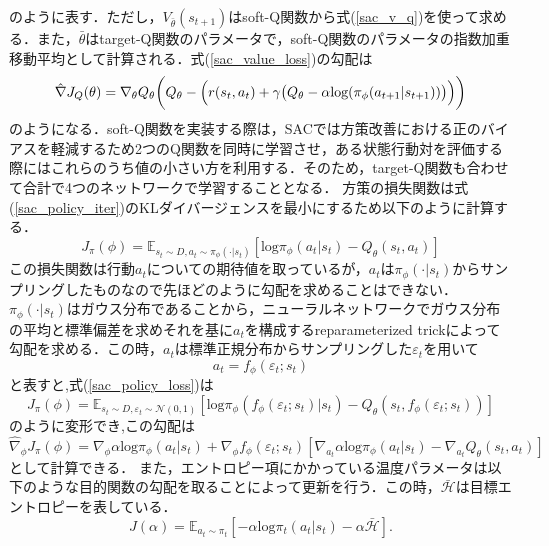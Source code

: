 \documentclass[dvipdfmx]{ampbt_nomag}
\begin{document}
のように表す．ただし，$V_{\bar{\theta}}(s_{t+1})$はsoft-Q関数から式(\ref{sac_v_q})を使って求める．また，$\bar{\theta}$はtarget-Q関数のパラメータで，soft-Q関数のパラメータの指数加重移動平均として計算される．式(\ref{sac_value_loss})の勾配は
\begin{eqnarray}
  \hat{\nabla}J_Q(\theta) = \nabla_\theta Q_\theta\biggl(Q_\theta - \Bigl(r(s_t,a_t) + \gamma \bigl(Q_\theta - \alpha \textrm{log}(\pi_{\phi}(a_{t+1}|s_{t+1}))\bigl)\Bigl)\biggl) 
\end{eqnarray}
のようになる．soft-Q関数を実装する際は，SACでは方策改善における正のバイアスを軽減するため2つのQ関数を同時に学習させ，ある状態行動対を評価する際にはこれらのうち値の小さい方を利用する\cite{DoubleQ}．そのため，target-Q関数も合わせて合計で4つのネットワークで学習することとなる．
方策の損失関数は式(\ref{sac_policy_iter})のKLダイバージェンスを最小にするため以下のように計算する．
\begin{equation} \label{sac_policy_loss}
  J_\pi(\phi) = \mathbb{E}_{s_t \sim D,a_t\sim\pi_\phi(\cdot|s_t)} \left[\textrm{log}\pi_\phi(a_t | s_t) - Q_\theta(s_t,a_t)\right]
\end{equation}
この損失関数は行動$a_t$についての期待値を取っているが，$a_t$は$\pi_\phi(\cdot|s_t)$からサンプリングしたものなので先ほどのように勾配を求めることはできない．$\pi_\phi(\cdot|s_t)$はガウス分布であることから，ニューラルネットワークでガウス分布の平均と標準偏差を求めそれを基に$a_t$を構成するreparameterized trickによって勾配を求める．この時，$a_t$は標準正規分布からサンプリングした$\varepsilon_t$を用いて
\begin{equation} \label{reparameterization}
  a_t = f_\phi(\varepsilon_t;s_t)
\end{equation}
と表すと,式(\ref{sac_policy_loss})は
\begin{equation} \label{sac_policy_loss_reparameterized}
  J_\pi(\phi) = \mathbb{E}_{s_t \sim D,\varepsilon_t \sim \mathcal{N}(0,1)} \left[\textrm{log}\pi_\phi(f_\phi(\varepsilon_t;s_t) | s_t) - Q_\theta(s_t,f_\phi(\varepsilon_t;s_t))\right]
\end{equation}
のように変形でき,この勾配は
\begin{equation} \label{sac_policy_gradient}
  \hat{\nabla}_\phi J_\pi(\phi) = \nabla_\phi \alpha \textrm{log}\pi_\phi(a_t|s_t) + \nabla_\phi f_\phi(\varepsilon_t;s_t)[\nabla_{a_t}\alpha \textrm{log} \pi_\phi(a_t|s_t) - \nabla_{a_t}Q_\theta(s_t,a_t)]
\end{equation}
として計算できる．
また，エントロピー項にかかっている温度パラメータは以下のような目的関数の勾配を取ることによって更新を行う\cite{SAC2}．この時，$\bar{\mathcal{H}}$は目標エントロピーを表している．
\begin{equation} \label{temparature_tunning}
J(\alpha) = \mathbb{E}_{a_t\sim\pi_t}[-\alpha \textrm{log}\pi_t(a_t|s_t)-\alpha\bar{\mathcal{H}}].
\end{equation}
\end{document}
